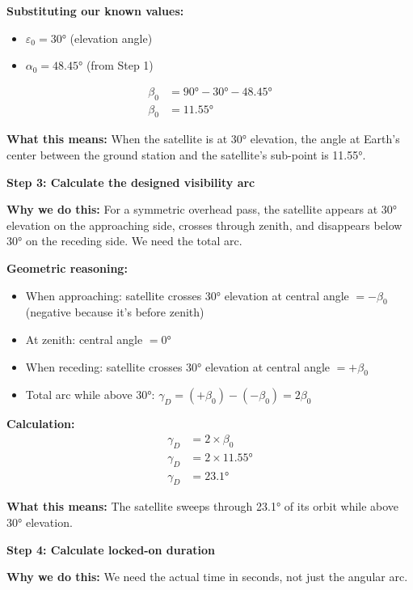 \documentclass[11pt,letterpaper]{article}
\begin{document}
\textbf{Substituting our known values:}
\begin{itemize}
    \item $\varepsilon_0 = 30°$ (elevation angle)
    \item $\alpha_0 = 48.45°$ (from Step 1)
\end{itemize}

\begin{align}
\beta_0 &= 90° - 30° - 48.45° \\
\beta_0 &= 11.55°
\end{align}

\textbf{What this means:} When the satellite is at 30° elevation, the angle at Earth's center between the ground station and the satellite's sub-point is 11.55°.

\vspace{0.3cm}

\textbf{Step 3: Calculate the designed visibility arc}

\textbf{Why we do this:} For a symmetric overhead pass, the satellite appears at 30° elevation on the approaching side, crosses through zenith, and disappears below 30° on the receding side. We need the total arc.

\textbf{Geometric reasoning:}
\begin{itemize}
    \item When approaching: satellite crosses 30° elevation at central angle $= -\beta_0$ (negative because it's before zenith)
    \item At zenith: central angle $= 0°$
    \item When receding: satellite crosses 30° elevation at central angle $= +\beta_0$
    \item Total arc while above 30°: $\gamma_D = (+\beta_0) - (-\beta_0) = 2\beta_0$
\end{itemize}

\textbf{Calculation:}
\begin{align}
\gamma_D &= 2 \times \beta_0 \\
\gamma_D &= 2 \times 11.55° \\
\gamma_D &= 23.1°
\end{align}

\textbf{What this means:} The satellite sweeps through 23.1° of its orbit while above 30° elevation.

\vspace{0.3cm}

\textbf{Step 4: Calculate locked-on duration}

\textbf{Why we do this:} We need the actual time in seconds, not just the angular arc.
\end{document}
